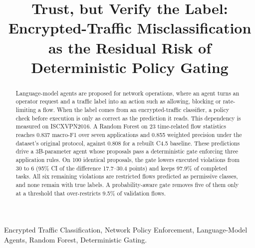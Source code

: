 \documentclass[conference,a4paper]{IEEEtran}
\begin{document}
\title{Trust, but Verify the Label: Encrypted-Traffic Misclassification as the Residual Risk of Deterministic Policy Gating}

\author{
\and
{}
\and
{}
}

\maketitle

\begin{abstract}
Language-model agents are proposed for network operations, where an agent turns an operator request and a traffic label into an action such as allowing, blocking or rate-limiting a flow. When the label comes from an encrypted-traffic classifier, a policy check before execution is only as correct as the prediction it reads. This dependency is measured on ISCXVPN2016. A Random Forest on 23 time-related flow statistics reaches 0.837 macro-F1 over seven applications and 0.855 weighted precision under the dataset's original protocol, against 0.808 for a rebuilt C4.5 baseline. These predictions drive a 3B-parameter agent whose proposals pass a deterministic gate enforcing three application rules. On 100 identical proposals, the gate lowers executed violations from 30 to 6 (95\% CI of the difference 17.7--30.4 points) and keeps 97.9\% of completed tasks. All six remaining violations are restricted flows predicted as permissive classes, and none remain with true labels. A probability-aware gate removes five of them only at a threshold that over-restricts 9.5\% of validation flows.
\end{abstract}

\begin{IEEEkeywords}
Encrypted Traffic Classification, Network Policy Enforcement, Language-Model Agents, Random Forest, Deterministic Gating.
\end{IEEEkeywords}
\end{document}
